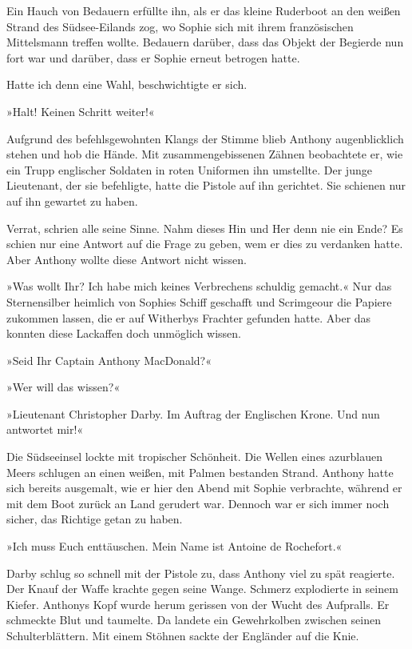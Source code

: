 \tb

Ein Hauch von Bedauern erfüllte ihn, als er das kleine Ruderboot an
den weißen Strand des Südsee-Eilands zog, wo Sophie sich mit ihrem
französischen Mittelsmann treffen wollte. Bedauern darüber, dass
das Objekt der Begierde nun fort war und darüber, dass er Sophie
erneut betrogen hatte.

Hatte ich denn eine Wahl, beschwichtigte er sich.

»Halt! Keinen Schritt weiter!«

Aufgrund des befehlsgewohnten Klangs der Stimme blieb Anthony
augenblicklich stehen und hob die Hände. Mit zusammengebissenen
Zähnen beobachtete er, wie ein Trupp englischer Soldaten in roten
Uniformen ihn umstellte. Der junge Lieutenant, der sie befehligte,
hatte die Pistole auf ihn gerichtet. Sie schienen nur auf ihn
gewartet zu haben.

Verrat, schrien alle seine Sinne. Nahm dieses Hin und Her denn nie
ein Ende? Es schien nur eine Antwort auf die Frage zu geben, wem er
dies zu verdanken hatte. Aber Anthony wollte diese Antwort nicht
wissen.

»Was wollt Ihr? Ich habe mich keines Verbrechens schuldig gemacht.«
Nur das Sternensilber heimlich von Sophies Schiff geschafft und
Scrimgeour die Papiere zukommen lassen, die er auf Witherbys
Frachter gefunden hatte. Aber das konnten diese Lackaffen doch
unmöglich wissen.

»Seid Ihr Captain Anthony MacDonald?«

»Wer will das wissen?«

»Lieutenant Christopher Darby. Im Auftrag der Englischen Krone. Und
nun antwortet mir!«

Die Südseeinsel lockte mit tropischer Schönheit. Die Wellen eines
azurblauen Meers schlugen an einen weißen, mit Palmen bestanden
Strand. Anthony hatte sich bereits ausgemalt, wie er hier den Abend
mit Sophie verbrachte, während er mit dem Boot zurück an Land
gerudert war. Dennoch war er sich immer noch sicher, das Richtige
getan zu haben.

»Ich muss Euch enttäuschen. Mein Name ist Antoine de Rochefort.«

Darby schlug so schnell mit der Pistole zu, dass Anthony viel zu
spät reagierte. Der Knauf der Waffe krachte gegen seine Wange.
Schmerz explodierte in seinem Kiefer. Anthonys Kopf wurde herum
gerissen von der Wucht des Aufpralls. Er schmeckte Blut und
taumelte. Da landete ein Gewehrkolben zwischen seinen
Schulterblättern. Mit einem Stöhnen sackte der Engländer auf die
Knie.

